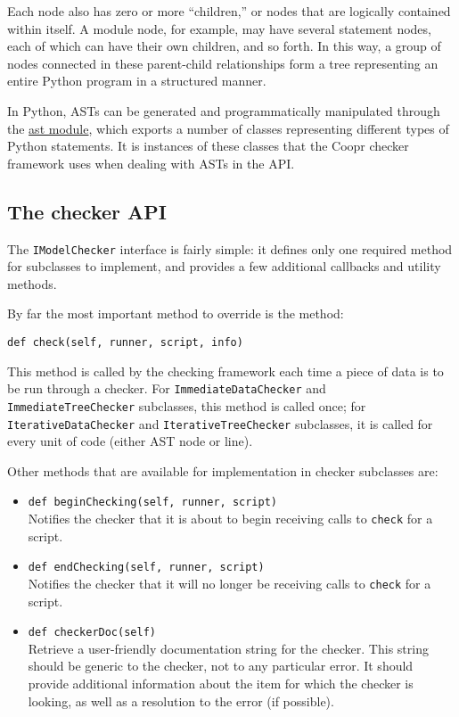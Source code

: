 \documentclass{article}
\begin{document}
Each node also has zero or more ``children,'' or nodes that are logically contained within itself. A module node, for example, may have several statement nodes, each of which can have their own children, and so forth. In this way, a group of nodes connected in these parent-child relationships form a tree representing an entire Python program in a structured manner.

In Python, ASTs can be generated and programmatically manipulated through the \href{http://docs.python.org/library/ast.html}{ast module}, which exports a number of classes representing different types of Python statements. It is instances of these classes that the Coopr checker framework uses when dealing with ASTs in the API.

\subsection*{The checker API}
The \verb!IModelChecker! interface is fairly simple: it defines only one required method for subclasses to implement, and provides a few additional callbacks and utility methods.

By far the most important method to override is the method:

\begin{verbatim}
def check(self, runner, script, info)
\end{verbatim}

This method is called by the checking framework each time a piece of data is to be run through a checker. For \verb!ImmediateDataChecker! and \verb!ImmediateTreeChecker! subclasses, this method is called once; for \verb!IterativeDataChecker! and \verb!IterativeTreeChecker! subclasses, it is called for every unit of code (either AST node or line).

Other methods that are available for implementation in checker subclasses are:

\begin{itemize}
\item \verb!def beginChecking(self, runner, script)! \\
Notifies the checker that it is about to begin receiving calls to \verb!check! for a script.
\item \verb!def endChecking(self, runner, script)! \\
Notifies the checker that it will no longer be receiving calls to \verb!check! for a script.
\item \verb!def checkerDoc(self)! \\
Retrieve a user-friendly documentation string for the checker. This string should be generic to the checker, not to any particular error. It should provide additional information about the item for which the checker is looking, as well as a resolution to the error (if possible).
\end{itemize}
\end{document}
